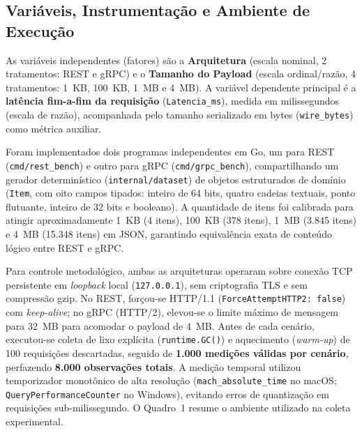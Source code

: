 \documentclass[a4paper, 12pt]{article}
\begin{document}
\subsection{Variáveis, Instrumentação e Ambiente de Execução}

As variáveis independentes (fatores) são a \textbf{Arquitetura} (escala nominal, 2 tratamentos: REST e gRPC) e o \textbf{Tamanho do Payload} (escala ordinal/razão, 4 tratamentos: 1~KB, 100~KB, 1~MB e 4~MB). A variável dependente principal é a \textbf{latência fim-a-fim da requisição} (\texttt{Latencia\_ms}), medida em milissegundos (escala de razão), acompanhada pelo tamanho serializado em bytes (\texttt{wire\_bytes}) como métrica auxiliar.

Foram implementados dois programas independentes em Go, um para REST (\texttt{cmd/rest\_bench}) e outro para gRPC (\texttt{cmd/grpc\_bench}), compartilhando um gerador determinístico (\texttt{internal/dataset}) de objetos estruturados de domínio (\texttt{Item}, com oito campos tipados: inteiro de 64 bits, quatro cadeias textuais, ponto flutuante, inteiro de 32 bits e booleano). A quantidade de itens foi calibrada para atingir aproximadamente 1~KB (4 itens), 100~KB (378 itens), 1~MB (3.845 itens) e 4~MB (15.348 itens) em JSON, garantindo equivalência exata de conteúdo lógico entre REST e gRPC.

Para controle metodológico, ambas as arquiteturas operaram sobre conexão TCP persistente em \textit{loopback} local (\texttt{127.0.0.1}), sem criptografia TLS e sem compressão gzip. No REST, forçou-se HTTP/1.1 (\texttt{ForceAttemptHTTP2: false}) com \textit{keep-alive}; no gRPC (HTTP/2), elevou-se o limite máximo de mensagem para 32~MB para acomodar o payload de 4~MB. Antes de cada cenário, executou-se coleta de lixo explícita (\texttt{runtime.GC()}) e aquecimento (\textit{warm-up}) de 100 requisições descartadas, seguido de \textbf{1.000 medições válidas por cenário}, perfazendo \textbf{8.000 observações totais}. A medição temporal utilizou temporizador monotônico de alta resolução (\texttt{mach\_absolute\_time} no macOS; \texttt{QueryPerformanceCounter} no Windows), evitando erros de quantização em requisições sub-milissegundo. O Quadro~1 resume o ambiente utilizado na coleta experimental.
\end{document}
